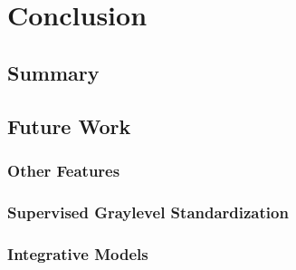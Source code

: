 \chapter{Conclusion}
\section{Summary}
\section{Future Work}
%
% 
\subsection{Other Features}
\subsection{Supervised Graylevel Standardization}
\subsection{Integrative Models}
